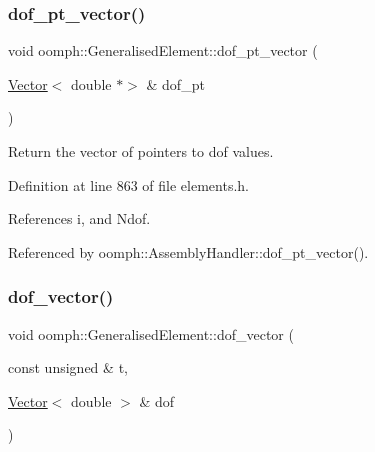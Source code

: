\mbox{\label{classoomph_1_1GeneralisedElement_ae30cdd0cb8f2eb4de856cd202762b19e}} 
\subsubsection{\texorpdfstring{dof\+\_\+pt\+\_\+vector()}{dof\_pt\_vector()}}
{\footnotesize\ttfamily void oomph\+::\+Generalised\+Element\+::dof\+\_\+pt\+\_\+vector (\begin{DoxyParamCaption}\item[{\hyperlink{classoomph_1_1Vector}{Vector}$<$ double $\ast$$>$ \&}]{dof\+\_\+pt }\end{DoxyParamCaption})\hspace{0.3cm}{\ttfamily [inline]}}



Return the vector of pointers to dof values. 



Definition at line 863 of file elements.\+h.



References i, and Ndof.



Referenced by oomph\+::\+Assembly\+Handler\+::dof\+\_\+pt\+\_\+vector().

\mbox{\label{classoomph_1_1GeneralisedElement_a14f3cf0fbf4f2f7ae45cac6beef398c7}} 
\subsubsection{\texorpdfstring{dof\+\_\+vector()}{dof\_vector()}}
{\footnotesize\ttfamily void oomph\+::\+Generalised\+Element\+::dof\+\_\+vector (\begin{DoxyParamCaption}\item[{const unsigned \&}]{t,  }\item[{\hyperlink{classoomph_1_1Vector}{Vector}$<$ double $>$ \&}]{dof }\end{DoxyParamCaption})\hspace{0.3cm}{\ttfamily [inline]}}



